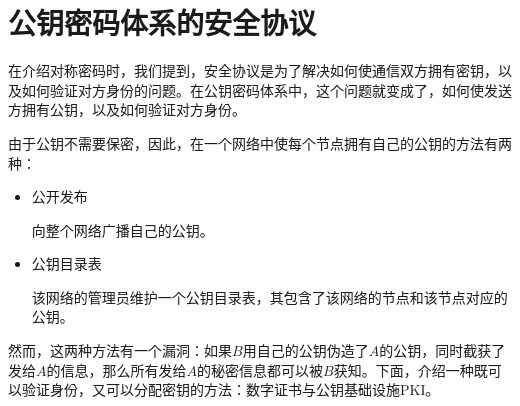 \section{公钥密码体系的安全协议}
在介绍对称密码时，我们提到，安全协议是为了解决如何使通信双方拥有密钥，以及如何验证对方身份的问题。在公钥密码体系中，这个问题就变成了，如何使发送方拥有公钥，以及如何验证对方身份。\par
由于公钥不需要保密，因此，在一个网络中使每个节点拥有自己的公钥的方法有两种：
\begin{itemize}
    \item 公开发布\par
    向整个网络广播自己的公钥。
    \item 公钥目录表\par
    该网络的管理员维护一个公钥目录表，其包含了该网络的节点和该节点对应的公钥。
\end{itemize}

然而，这两种方法有一个漏洞：如果$B$用自己的公钥伪造了$A$的公钥，同时截获了发给$A$的信息，那么所有发给$A$的秘密信息都可以被$B$获知。下面，介绍一种既可以验证身份，又可以分配密钥的方法：数字证书与公钥基础设施PKI。